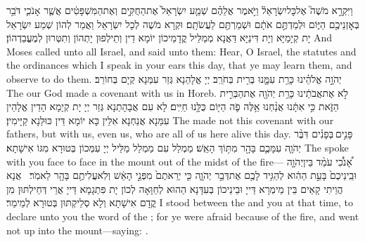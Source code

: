 \newperek
{}%
{וַיִּקְרָ֣א מֹשֶׁה֮ אֶל\maqqaf כׇּל\maqqaf יִשְׂרָאֵל֒ וַיֹּ֣אמֶר אֲלֵהֶ֗ם שְׁמַ֤ע יִשְׂרָאֵל֙ אֶת\maqqaf הַחֻקִּ֣ים וְאֶת\maqqaf הַמִּשְׁפָּטִ֔ים אֲשֶׁ֧ר אָנֹכִ֛י דֹּבֵ֥ר בְּאׇזְנֵיכֶ֖ם הַיּ֑וֹם וּלְמַדְתֶּ֣ם אֹתָ֔ם וּשְׁמַרְתֶּ֖ם לַעֲשֹׂתָֽם׃}
{וּקְרָא מֹשֶׁה לְכָל יִשְׂרָאֵל וַאֲמַר לְהוֹן שְׁמַע יִשְׂרָאֵל יָת קְיָמַיָּא וְיָת דִּינַיָּא דַּאֲנָא מְמַלֵּיל קֳדָמֵיכוֹן יוֹמָא דֵין וְתֵילְפוּן יָתְהוֹן וְתִטְּרוּן לְמֶעֱבַדְהוֹן׃}
{And Moses called unto all Israel, and said unto them: Hear, O Israel, the statutes and the ordinances which I speak in your ears this day, that ye may learn them, and observe to do them.}{}
{יְהֹוָ֣ה אֱלֹהֵ֗ינוּ כָּרַ֥ת עִמָּ֛נוּ בְּרִ֖ית בְּחֹרֵֽב׃}
{יְיָ אֱלָהַנָא גְּזַר עִמַּנָא קְיָם בְּחוֹרֵב׃}
{The \lord\space our God made a covenant with us in Horeb.}{}
{לֹ֣א אֶת\maqqaf אֲבֹתֵ֔ינוּ כָּרַ֥ת יְהֹוָ֖ה אֶת\maqqaf הַבְּרִ֣ית הַזֹּ֑את כִּ֣י אִתָּ֔נוּ אֲנַ֨חְנוּ אֵ֥לֶּה פֹ֛ה הַיּ֖וֹם כֻּלָּ֥נוּ חַיִּֽים׃}
{לָא עִם אֲבָהָתַנָא גְּזַר יְיָ יָת קְיָמָא הָדֵין אֱלָהֵין עִמַּנָא אֲנַחְנָא אִלֵּין כָּא יוֹמָא דֵּין כּוּלַּנָא קַיָּימִין׃}
{The \lord\space made not this covenant with our fathers, but with us, even us, who are all of us here alive this day.}{}
{פָּנִ֣ים \legarmeh  בְּפָנִ֗ים דִּבֶּ֨ר יְהֹוָ֧ה עִמָּכֶ֛ם בָּהָ֖ר מִתּ֥וֹךְ הָאֵֽשׁ׃}
{מַמְלַל עִם מַמְלַל מַלֵּיל יְיָ עִמְּכוֹן בְּטוּרָא מִגּוֹ אִישָׁתָא׃}
{The \lord\space spoke with you face to face in the mount out of the midst of the fire—}{}
{אָ֠נֹכִ֠י עֹמֵ֨ד בֵּין\maqqaf יְהֹוָ֤ה וּבֵֽינֵיכֶם֙ בָּעֵ֣ת הַהִ֔וא לְהַגִּ֥יד לָכֶ֖ם אֶת\maqqaf דְּבַ֣ר יְהֹוָ֑ה כִּ֤י יְרֵאתֶם֙ מִפְּנֵ֣י הָאֵ֔שׁ וְלֹֽא\maqqaf עֲלִיתֶ֥ם בָּהָ֖ר לֵאמֹֽר׃ \setuma }
{אֲנָא הֲוֵיתִי קָאֵים בֵּין מֵימְרָא דַּייָ וּבֵינֵיכוֹן בְּעִדָּנָא הַהוּא לְחַוָּאָה לְכוֹן יָת פִּתְגָמָא דַּייָ אֲרֵי דְּחֵילְתּוּן מִן קֳדָם אִישָׁתָא וְלָא סְלֵיקְתּוּן בְּטוּרָא לְמֵימַר׃}
{I stood between the \lord\space and you at that time, to declare unto you the word of the \lord; for ye were afraid because of the fire, and went not up into the mount—saying: .}{}
